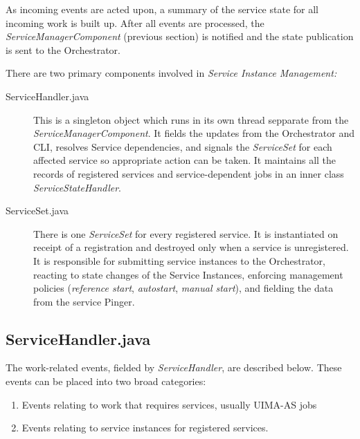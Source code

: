     As incoming events are acted upon, a summary of the service state for all
    incoming work is built up.  After all events are processed, the {\em ServiceManagerComponent} 
    (previous section) is notified and the state publication is sent to the Orchestrator.

    There are two primary components involved in {\em Service Instance Management:}
    \begin{description}
      \item[ServiceHandler.java] This is a singleton object which runs in its own 
        thread sepparate from the {\em ServiceManagerComponent}.  It fields the
        updates from the Orchestrator and CLI, resolves Service dependencies, and signals
        the {\em ServiceSet} for each affected service so appropriate action can be taken.
        It maintains all the records of registered services and service-dependent jobs
        in an inner class {\em ServiceStateHandler}.
      \item[ServiceSet.java] There is one {\em ServiceSet} for every registered service.  It is
        instantiated on receipt of a registration and destroyed only when a service is unregistered.
        It is responsible for submitting service instances to the Orchestrator, reacting to state
        changes of the Service Instances, enforcing management policies ({\em reference start}, {\em
          autostart}, {\em manual start}), and fielding the data from the service Pinger.
    \end{description}
      
\subsection{ServiceHandler.java}
    The work-related events, fielded by {\em ServiceHandler}, are described below.
    These events can be placed into two broad categories:
    \begin{enumerate}
      \item Events relating to work that requires services, usually UIMA-AS jobs
      \item Events relating to service instances for registered services.  
    \end{enumerate}
    
